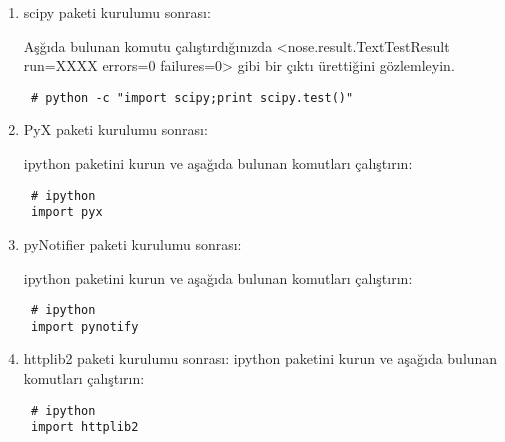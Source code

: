 \documentclass[a4paper,10pt]{article}
\begin{document}
\begin{enumerate}
\item scipy paketi kurulumu sonrası:

Aşğıda bulunan komutu çalıştırdığınızda <nose.result.TextTestResult run=XXXX errors=0 failures=0> gibi bir çıktı ürettiğini gözlemleyin.
\begin{verbatim}
 # python -c "import scipy;print scipy.test()"
\end{verbatim}

\item PyX paketi kurulumu sonrası:

ipython paketini kurun ve aşağıda bulunan komutları çalıştırın:
\begin{verbatim}
 # ipython
 import pyx
\end{verbatim}

\item pyNotifier paketi kurulumu sonrası:

ipython paketini kurun ve aşağıda bulunan komutları çalıştırın:
\begin{verbatim}
 # ipython
 import pynotify
\end{verbatim}


\item httplib2 paketi kurulumu sonrası:
ipython paketini kurun ve aşağıda bulunan komutları çalıştırın:
\begin{verbatim}
 # ipython
 import httplib2
\end{verbatim}


\end{enumerate}
\end{document}
